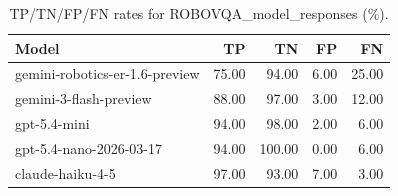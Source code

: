 \begin{table}
\caption{TP/TN/FP/FN rates for ROBOVQA_model_responses (\%).}
\label{tab:robovqa_model_responses_model_rates}
\begin{tabular}{lrrrr}
\toprule
Model & TP & TN & FP & FN \\
\midrule
gemini-robotics-er-1.6-preview & 75.00 & 94.00 & 6.00 & 25.00 \\
gemini-3-flash-preview & 88.00 & 97.00 & 3.00 & 12.00 \\
gpt-5.4-mini & 94.00 & 98.00 & 2.00 & 6.00 \\
gpt-5.4-nano-2026-03-17 & 94.00 & 100.00 & 0.00 & 6.00 \\
claude-haiku-4-5 & 97.00 & 93.00 & 7.00 & 3.00 \\
\bottomrule
\end{tabular}
\end{table}
